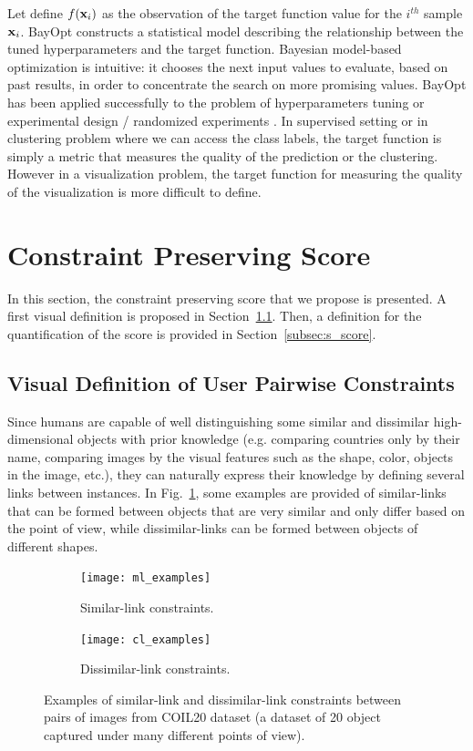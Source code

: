 Let define $f({\bf x}_i)$ as the observation of the target function value for the $i^{th}$ sample ${\bf x}_i$.
BayOpt constructs a statistical model describing the relationship between
the tuned hyperparameters and the target function.
Bayesian model-based optimization is intuitive: it chooses the next input values to evaluate, based on past results, in order to concentrate the search on more promising values. BayOpt has been applied successfully to the problem of hyperparameters tuning \cite{snoek2012practical} or experimental design / randomized experiments \cite{letham2019constrained}.
In supervised setting or in clustering problem where we can access the class labels, the target function is simply a metric that measures the quality of the prediction or the clustering.
However in a visualization problem, the target function for measuring the quality of the visualization is more difficult to define.

\section{Constraint Preserving Score}\label{sec:proposed_method}

In this section, the constraint preserving score that we propose is presented. A first visual definition is proposed in Section~\ref{subsec:visual_def}. Then, a definition for the quantification of the score is provided in Section~\ref{subsec:s_score}.

\subsection{Visual Definition of User Pairwise Constraints}\label{subsec:visual_def}

Since humans are capable of well distinguishing some similar and dissimilar high-dimensional objects with prior knowledge (e.g. comparing countries only by their name, comparing images by the visual features such as the shape, color, objects in the image, etc.), they can naturally express their knowledge by defining several links between instances.
In Fig.~\ref{fig:ml_cl_examples}, some examples are provided of similar-links that can be formed between objects that are very similar and only differ based on the point of view, while dissimilar-links can be formed between objects of different shapes.

\begin{figure}
    \centering
    \begin{subfigure}[c]{0.48\linewidth}
        \texttt{[image: ml\_examples]}
        \caption{\footnotesize{Similar-link constraints.}}
    \end{subfigure}
    \begin{subfigure}[c]{0.48\linewidth}
        \texttt{[image: cl\_examples]}
        \caption{\footnotesize{Dissimilar-link constraints.}}
    \end{subfigure}
    \caption{Examples of similar-link and dissimilar-link constraints between pairs of images from COIL20 dataset (a dataset of 20 object captured under many different points of view).}
    \label{fig:ml_cl_examples}
\end{figure}


